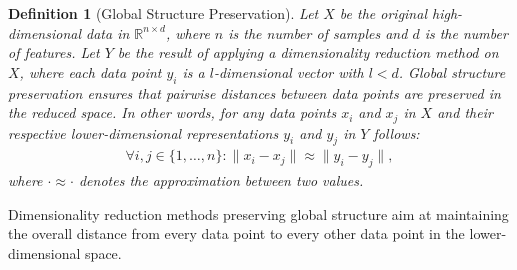 \documentclass[pdftex,12pt,a4paper]{report}
\newtheorem{definition}{Definition}[section]
\begin{document}
\begin{definition}[Global Structure Preservation]
    Let $X$ be the original high-dimensional data in $\mathbb{R}^{n \times d}$, where $n$ is the number of samples and $d$ is the number of features.
    Let $Y$ be the result of applying a dimensionality reduction method on $X$, where each data point $y_i$ is a $l$-dimensional vector with $l < d$.
    Global structure preservation ensures that pairwise distances between data points are preserved in the reduced space.
    In other words, for any data points $x_i$ and $x_j$ in $X$ and their respective lower-dimensional representations $y_i$ and $y_j$ in $Y$ follows:
    \begin{align*}
        \forall i, j \in \{1, \dots, n \}: \| x_i - x_j \| \approx \| y_i - y_j \|,
    \end{align*}
    where $ \cdot \approx \cdot$ denotes the approximation between two values.
\end{definition}

Dimensionality reduction methods preserving global structure aim at maintaining the overall distance from every data point to every other data point in the lower-dimensional space.
\end{document}
